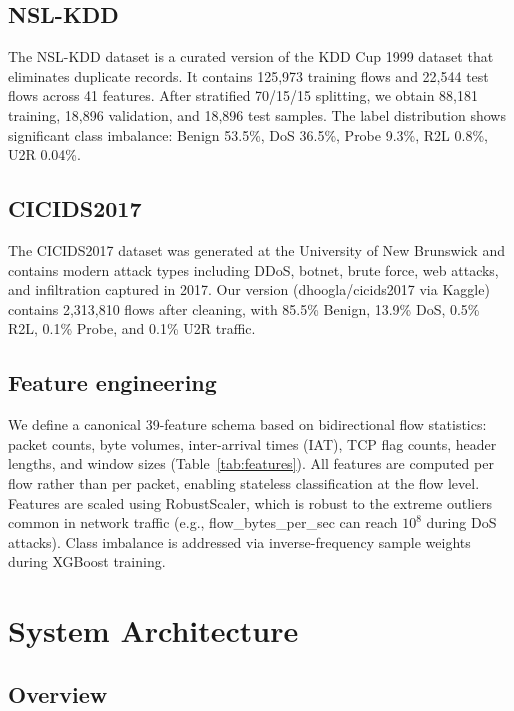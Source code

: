 \documentclass[review]{elsarticle}  %
\begin{document}
\subsection{NSL-KDD}

The NSL-KDD dataset \cite{ref20} is a curated version of the
KDD Cup 1999 dataset that eliminates duplicate records. It
contains 125,973 training flows and 22,544 test flows across
41 features. After stratified 70/15/15 splitting, we obtain
88,181 training, 18,896 validation, and 18,896 test samples.
The label distribution shows significant class imbalance:
Benign 53.5\%, DoS 36.5\%, Probe 9.3\%, R2L 0.8\%, U2R 0.04\%.

\subsection{CICIDS2017}

The CICIDS2017 dataset \cite{ref21} was generated at the
University of New Brunswick and contains modern attack types
including DDoS, botnet, brute force, web attacks, and infiltration
captured in 2017. Our version (dhoogla/cicids2017 via Kaggle)
contains 2,313,810 flows after cleaning, with 85.5\% Benign,
13.9\% DoS, 0.5\% R2L, 0.1\% Probe, and 0.1\% U2R traffic.

\subsection{Feature engineering}

We define a canonical 39-feature schema based on bidirectional
flow statistics: packet counts, byte volumes, inter-arrival times
(IAT), TCP flag counts, header lengths, and window sizes
(Table~\ref{tab:features}). All features are computed per flow
rather than per packet, enabling stateless classification at the
flow level. Features are scaled using RobustScaler, which is
robust to the extreme outliers common in network traffic
(e.g., flow\_bytes\_per\_sec can reach $10^8$ during DoS attacks).
Class imbalance is addressed via inverse-frequency sample weights
during XGBoost training.

\section{System Architecture}
\label{sec:system}

\subsection{Overview}
\end{document}
